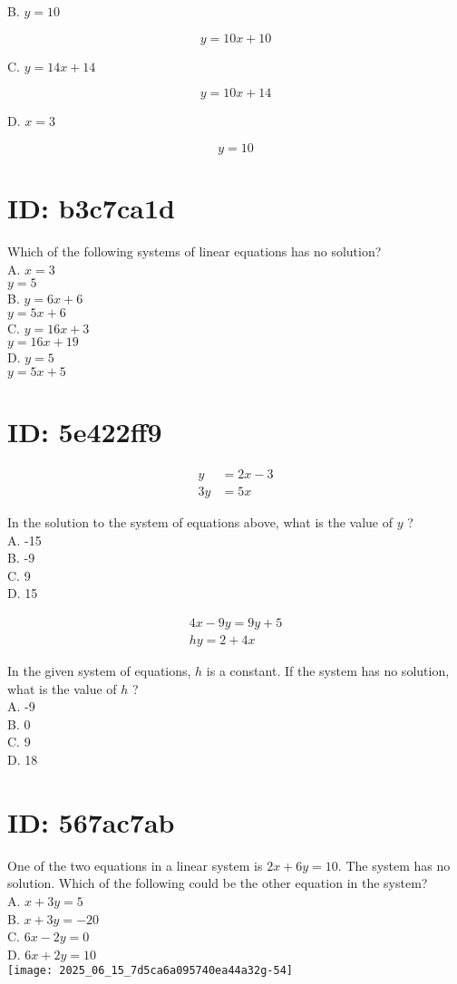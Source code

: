 B. $y=10$

$$
y=10 x+10
$$

C. $y=14 x+14$

$$
y=10 x+14
$$

D. $x=3$

$$
y=10
$$

\section*{ID: b3c7ca1d}
Which of the following systems of linear equations has no solution?\\
A. $x=3$\\
$y=5$\\
B. $y=6 x+6$\\
$y=5 x+6$\\
C. $y=16 x+3$\\
$y=16 x+19$\\
D. $y=5$\\
$y=5 x+5$

\section*{ID: 5e422ff9}
$$
\begin{aligned}
y & =2 x-3 \\
3 y & =5 x
\end{aligned}
$$

In the solution to the system of equations above, what is the value of $y$ ?\\
A. -15\\
B. -9\\
C. 9\\
D. 15

$$
\begin{gathered}
4 x-9 y=9 y+5 \\
h y=2+4 x
\end{gathered}
$$

In the given system of equations, $h$ is a constant. If the system has no solution, what is the value of $h$ ?\\
A. -9\\
B. 0\\
C. 9\\
D. 18

\section*{ID: 567ac7ab}
One of the two equations in a linear system is $2 x+6 y=10$. The system has no solution. Which of the following could be the other equation in the system?\\
A. $x+3 y=5$\\
B. $x+3 y=-20$\\
C. $6 x-2 y=0$\\
D. $6 x+2 y=10$\\
\texttt{[image: 2025\_06\_15\_7d5ca6a095740ea44a32g-54]}

